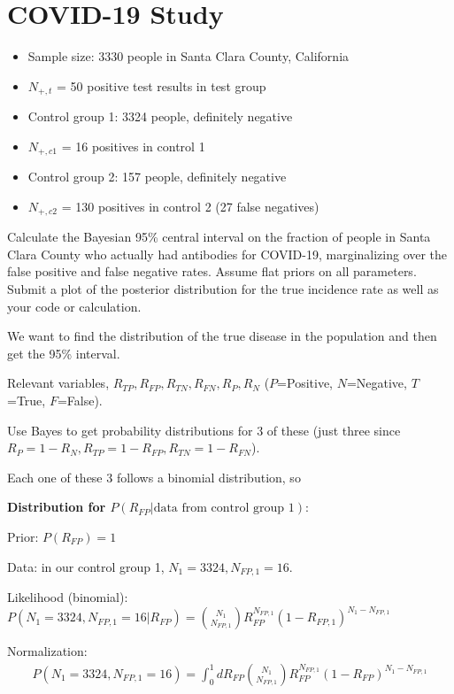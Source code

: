 \section{COVID-19 Study}
\begin{itemize}
    \item Sample size: 3330 people in Santa Clara County, California
    \item $N_{+,t}$ = 50 positive test results in test group
    \item Control group 1: 3324 people, definitely negative
    \item $N_{+,c1}$ = 16 positives in control 1
    \item Control group 2: 157 people, definitely negative
    \item $N_{+,c2}$ = 130 positives in control 2 (27 false negatives)
\end{itemize}

Calculate the Bayesian 95\% central interval on the fraction of people in Santa Clara County who actually had antibodies for COVID-19, marginalizing over the false positive and false negative rates. Assume flat priors on all parameters. Submit a plot of the posterior distribution for the true incidence rate as well as your code or calculation.

We want to find the distribution of the true disease in the population and then get the 95\% interval.

Relevant variables, $R_{TP}, R_{FP}, R_{TN}, R_{FN}, R_P, R_N$ ($P$=Positive, $N$=Negative, $T$=True, $F$=False).

Use Bayes to get probability distributions for 3 of these (just three since $R_P = 1 - R_N, R_{TP} = 1 - R_{FP}, R_{TN} = 1 - R_{FN}$).

Each one of these 3 follows a binomial distribution, so

\textbf{Distribution for $P(R_{FP}|\text{data from control group 1})$}:

Prior: $P(R_{FP}) = 1$

Data: in our control group 1, $N_1 = 3324, N_{FP,1} = 16$.

Likelihood (binomial): $P(N_1=3324, N_{FP,1}=16 | R_{FP}) = {N_1 \choose N_{FP,1}} R_{FP}^{N_{FP,1}} (1-R_{FP,1})^{N_1-N_{FP,1}}$

Normalization:
\begin{align*}
    P(N_1=3324, N_{FP,1}=16) = \int_0^1 dR_{FP} {N_1 \choose N_{FP,1}} R_{FP}^{N_{FP,1}} (1-R_{FP})^{N_1-N_{FP,1}} \\
\end{align*}

